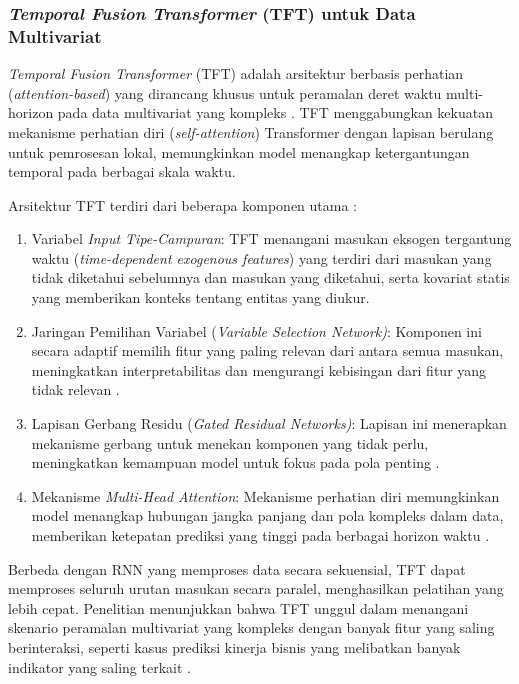 \subsubsection{\textit{Temporal Fusion Transformer} (TFT) untuk Data Multivariat}
\label{subsec:tft-literatur}

\textit{Temporal Fusion Transformer} (TFT) adalah arsitektur berbasis perhatian (\textit{attention-based}) yang dirancang khusus untuk peramalan deret waktu multi-horizon pada data multivariat yang kompleks \autocite{Lim2021TFT,Zhang2024ComprehensiveTSFSurvey}. TFT menggabungkan kekuatan mekanisme perhatian diri (\textit{self-attention}) Transformer dengan lapisan berulang untuk pemrosesan lokal, memungkinkan model menangkap ketergantungan temporal pada berbagai skala waktu.

Arsitektur TFT terdiri dari beberapa komponen utama \autocite{Lim2021TFT,Hartanto2024TFTEnhanced}:
\begin{enumerate}[label=\alph*.]
    \item Variabel \textit{Input Tipe-Campuran}: TFT menangani masukan eksogen tergantung waktu (\textit{time-dependent exogenous features}) yang terdiri dari masukan yang tidak diketahui sebelumnya dan masukan yang diketahui, serta kovariat statis yang memberikan konteks tentang entitas yang diukur.
    
    \item Jaringan Pemilihan Variabel (\textit{Variable Selection Network)}: Komponen ini secara adaptif memilih fitur yang paling relevan dari antara semua masukan, meningkatkan interpretabilitas dan mengurangi kebisingan dari fitur yang tidak relevan \autocite{Lim2021TFT}.
    
    \item Lapisan Gerbang Residu (\textit{Gated Residual Networks)}: Lapisan ini menerapkan mekanisme gerbang untuk menekan komponen yang tidak perlu, meningkatkan kemampuan model untuk fokus pada pola penting \autocite{Lim2021TFT}.
    
    \item Mekanisme \textit{Multi-Head Attention}: Mekanisme perhatian diri memungkinkan model menangkap hubungan jangka panjang dan pola kompleks dalam data, memberikan ketepatan prediksi yang tinggi pada berbagai horizon waktu \autocite{Hartanto2024TFTEnhanced}.
\end{enumerate}

Berbeda dengan RNN yang memproses data secara sekuensial, TFT dapat memproses seluruh urutan masukan secara paralel, menghasilkan pelatihan yang lebih cepat. Penelitian menunjukkan bahwa TFT unggul dalam menangani skenario peramalan multivariat yang kompleks dengan banyak fitur yang saling berinteraksi, seperti kasus prediksi kinerja bisnis yang melibatkan banyak indikator yang saling terkait \autocite{Hartanto2024TFTEnhanced,Cheng2025MultivariateTFFEng}.

